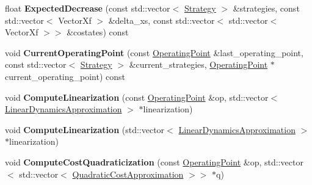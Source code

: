 \begin{DoxyCompactItemize}
\item 
float {\bfseries Expected\+Decrease} (const std\+::vector$<$ \hyperlink{structilqgames_1_1_strategy}{Strategy} $>$ \&strategies, const std\+::vector$<$ Vector\+Xf $>$ \&delta\+\_\+xs, const std\+::vector$<$ std\+::vector$<$ Vector\+Xf $>$$>$ \&costates) const \hypertarget{classilqgames_1_1_i_l_q_solver_a3616e04e66f092884d04aa3f544799af}{}\label{classilqgames_1_1_i_l_q_solver_a3616e04e66f092884d04aa3f544799af}

\item 
void {\bfseries Current\+Operating\+Point} (const \hyperlink{structilqgames_1_1_operating_point}{Operating\+Point} \&last\+\_\+operating\+\_\+point, const std\+::vector$<$ \hyperlink{structilqgames_1_1_strategy}{Strategy} $>$ \&current\+\_\+strategies, \hyperlink{structilqgames_1_1_operating_point}{Operating\+Point} $\ast$current\+\_\+operating\+\_\+point) const \hypertarget{classilqgames_1_1_i_l_q_solver_ae0145c002de655fd2b012d2142cacb6a}{}\label{classilqgames_1_1_i_l_q_solver_ae0145c002de655fd2b012d2142cacb6a}

\item 
void {\bfseries Compute\+Linearization} (const \hyperlink{structilqgames_1_1_operating_point}{Operating\+Point} \&op, std\+::vector$<$ \hyperlink{structilqgames_1_1_linear_dynamics_approximation}{Linear\+Dynamics\+Approximation} $>$ $\ast$linearization)\hypertarget{classilqgames_1_1_i_l_q_solver_a36c9160e4d5503b5160d04c0acd842d5}{}\label{classilqgames_1_1_i_l_q_solver_a36c9160e4d5503b5160d04c0acd842d5}

\item 
void {\bfseries Compute\+Linearization} (std\+::vector$<$ \hyperlink{structilqgames_1_1_linear_dynamics_approximation}{Linear\+Dynamics\+Approximation} $>$ $\ast$linearization)\hypertarget{classilqgames_1_1_i_l_q_solver_a28112eeff11ad20d5e5ead00bb61d80c}{}\label{classilqgames_1_1_i_l_q_solver_a28112eeff11ad20d5e5ead00bb61d80c}

\item 
void {\bfseries Compute\+Cost\+Quadraticization} (const \hyperlink{structilqgames_1_1_operating_point}{Operating\+Point} \&op, std\+::vector$<$ std\+::vector$<$ \hyperlink{structilqgames_1_1_quadratic_cost_approximation}{Quadratic\+Cost\+Approximation} $>$$>$ $\ast$q)\hypertarget{classilqgames_1_1_i_l_q_solver_a54d6c9c2afc1164cbcbc6b2eec7d2086}{}\label{classilqgames_1_1_i_l_q_solver_a54d6c9c2afc1164cbcbc6b2eec7d2086}

\end{DoxyCompactItemize}
